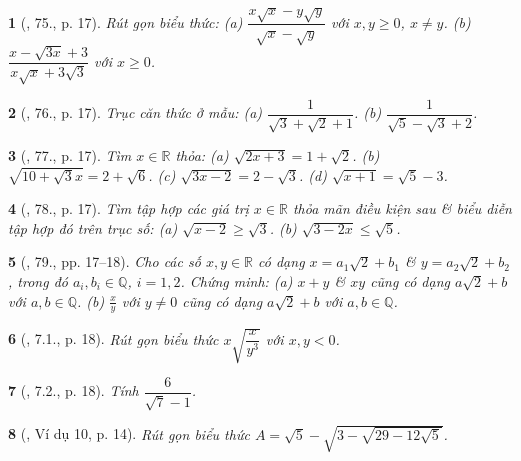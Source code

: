 \documentclass{article}
\newtheorem{baitoan}{}
\begin{document}
\begin{baitoan}[\cite{SBT_Toan_9_tap_1}, 75., p. 17]
	Rút gọn biểu thức: (a) $\dfrac{x\sqrt{x} - y\sqrt{y}}{\sqrt{x} - \sqrt{y}}$ với $x,y\ge0$, $x\ne y$. (b) $\dfrac{x - \sqrt{3x} + 3}{x\sqrt{x} + 3\sqrt{3}}$ với $x\ge0$.
\end{baitoan}

\begin{baitoan}[\cite{SBT_Toan_9_tap_1}, 76., p. 17]
	Trục căn thức ở mẫu: (a) $\dfrac{1}{\sqrt{3} + \sqrt{2} + 1}$. (b) $\dfrac{1}{\sqrt{5} - \sqrt{3} + 2}$.
\end{baitoan}

\begin{baitoan}[\cite{SBT_Toan_9_tap_1}, 77., p. 17]
	Tìm $x\in\mathbb{R}$ thỏa: (a) $\sqrt{2x + 3} = 1 + \sqrt{2}$. (b) $\sqrt{10 + \sqrt{3}x} = 2 + \sqrt{6}$. (c) $\sqrt{3x - 2} = 2 - \sqrt{3}$. (d) $\sqrt{x + 1} = \sqrt{5} - 3$.
\end{baitoan}

\begin{baitoan}[\cite{SBT_Toan_9_tap_1}, 78., p. 17]
	Tìm tập hợp các giá trị $x\in\mathbb{R}$ thỏa mãn điều kiện sau \& biểu diễn tập hợp đó trên trục số: (a) $\sqrt{x - 2}\ge\sqrt{3}$. (b) $\sqrt{3 - 2x}\le\sqrt{5}$.
\end{baitoan}

\begin{baitoan}[\cite{SBT_Toan_9_tap_1}, 79., pp. 17--18]
	Cho các số $x,y\in\mathbb{R}$ có dạng $x = a_1\sqrt{2} + b_1$ \& $y = a_2\sqrt{2} + b_2$, trong đó $a_i,b_i\in\mathbb{Q}$, $i = 1,2$. Chứng minh: (a) $x + y$ \& $xy$ cũng có dạng $a\sqrt{2} + b$ với $a,b\in\mathbb{Q}$. (b) $\frac{x}{y}$ với $y\ne0$ cũng có dạng $a\sqrt{2} + b$ với $a,b\in\mathbb{Q}$.
\end{baitoan}

\begin{baitoan}[\cite{SBT_Toan_9_tap_1}, 7.1., p. 18]
	Rút gọn biểu thức $x\sqrt{\dfrac{x}{y^3}}$ với $x,y < 0$.
\end{baitoan}

\begin{baitoan}[\cite{SBT_Toan_9_tap_1}, 7.2., p. 18]
	Tính $\dfrac{6}{\sqrt{7} - 1}$.
\end{baitoan}

\begin{baitoan}[\cite{Binh_Toan_9_tap_1}, Ví dụ 10, p. 14]
	Rút gọn biểu thức $A = \sqrt{5} - \sqrt{3 - \sqrt{29 - 12\sqrt{5}}}$.
\end{baitoan}
\end{document}
